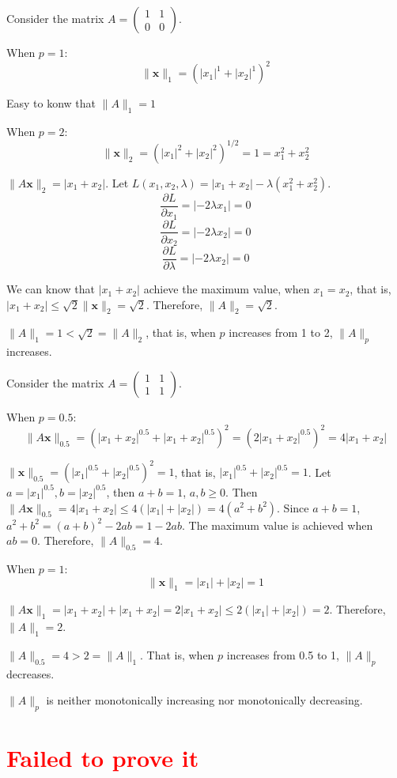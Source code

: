 \documentclass{article}
\begin{document}
Consider the matrix $ A=\begin{pmatrix}1&1\\0&0\end{pmatrix} $.

When $ p = 1 $:
$$
\|\mathbf{x}\|_{1}=\left(|x_1|^{1}+|x_2|^{1}\right)^2
$$

Easy to konw that $ \|A\|_{1}=1$

When $ p = 2 $:
$$
\|\mathbf{x}\|_2=\left(|x_1|^2+|x_2|^2\right)^{1/2}=1=x_1^2+x_2^2
$$

$ \|A\mathbf{x}\|_2 = |x_1 + x_2| $. Let $L(x_1,x_2,\lambda)=|x_1+x_2|-\lambda(x_1^2+x_2^2)$.
$$
\frac{\partial L}{\partial x_1}=|-2\lambda x_1|=0
$$
$$
\frac{\partial L}{\partial x_2}=|-2\lambda x_2|=0
$$
$$
\frac{\partial L}{\partial \lambda}=|-2\lambda x_2|=0
$$

We can know that $|x_1 + x_2|$ achieve the maximum value, when $x_1=x_2$, that is,
 $ |x_1 + x_2|\leq\sqrt{2}\|\mathbf{x}\|_2=\sqrt{2} $. Therefore, $ \|A\|_2=\sqrt{2}$.

$ \|A\|_{1}=1<\sqrt{2}=\|A\|_2 $, that is, when $ p $ increases from 1 to 2, $ \|A\|_p $ increases.

Consider the matrix $ A=\begin{pmatrix}1&1\\1&1\end{pmatrix} $.

When $ p = 0.5 $:
$$
\|A\mathbf{x}\|_{0.5}=\left(|x_1 + x_2|^{0.5}+|x_1 + x_2|^{0.5}\right)^2=(2|x_1 + x_2|^{0.5})^2 = 4|x_1 + x_2|
$$

$ \|\mathbf{x}\|_{0.5}=\left(|x_1|^{0.5}+|x_2|^{0.5}\right)^2 = 1 $, that is, $ |x_1|^{0.5}+|x_2|^{0.5}=1 $. Let $ a = |x_1|^{0.5}, b = |x_2|^{0.5} $, then $ a + b = 1 $, $ a,b\geq0 $. Then $ \|A\mathbf{x}\|_{0.5}=4|x_1 + x_2|\leq4(|x_1|+|x_2|)=4(a^2 + b^2) $. Since $ a + b = 1 $, $a^2 + b^2=(a + b)^2-2ab = 1 - 2ab $. The maximum value is achieved when $ ab = 0 $. Therefore, $ \|A\|_{0.5}=4 $.

When $ p = 1 $:
$$
\|\mathbf{x}\|_1=|x_1|+|x_2| = 1
$$

$ \|A\mathbf{x}\|_1=|x_1 + x_2|+|x_1 + x_2| = 2|x_1 + x_2|\leq2(|x_1|+|x_2|)=2 $. Therefore, $ \|A\|_1 = 2 $.

$ \|A\|_{0.5}=4>2=\|A\|_1$. That is, when $ p $ increases from 0.5 to 1, $ \|A\|_p $ decreases.

$\|A\|_p$ is neither monotonically increasing nor monotonically decreasing.

\section{\textcolor{red}{Failed to prove it}}
\end{document}
